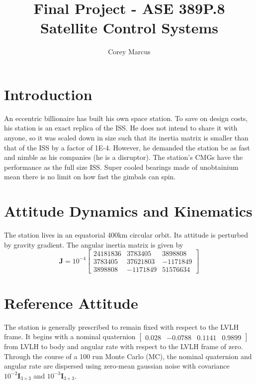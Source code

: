 \documentclass[]{article}
\title{Final Project - ASE 389P.8 Satellite Control Systems}
\author{Corey Marcus}
\begin{document}
\maketitle

\newcommand{\CrossProd}[1]{\left[ #1 \times \right]}

\section{Introduction}

An eccentric billionaire has built his own space station. To save on design costs, his station is an exact replica of the ISS. He does not intend to share it with anyone, so it was scaled down in size such that its inertia matrix is smaller than that of the ISS by a factor of 1E-4. However, he demanded the station be as fast and nimble as his companies (he is a disruptor). The station's CMGs have the performance as the full size ISS. Super cooled bearings made of unobtainium mean there is no limit on how fast the gimbals can spin. 

\section{Attitude Dynamics and Kinematics}

The station lives in an equatorial 400km circular orbit. Its attitude is perturbed by gravity gradient. The angular inertia matrix is given by
\begin{equation}
	\bm{J} = 10^{-4} \begin{bmatrix}
		24181836 & 3783405 & 3898808 \\
		3783405 & 37621803 & -1171849 \\
		3898808 & -1171849 & 51576634
	\end{bmatrix}
\end{equation}

\section{Reference Attitude}

The station is generally prescribed to remain fixed with respect to the LVLH frame. It begins with a nominal quaternion $\begin{bmatrix} 0.028 & -0.0788 & 0.1141 & 0.9899 \end{bmatrix} $ from LVLH to body and angular rate with respect to the LVLH frame of zero. Through the course of a 100 run Monte Carlo (MC), the nominal quaternion and angular rate are dispersed using zero-mean gaussian noise with covariance $10^{-2}\bm{I}_{3 \times 3}$ and $10^{-3}\bm{I}_{3 \times 3}$.
\end{document}
